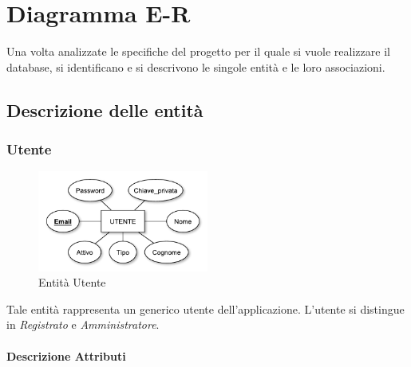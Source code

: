 
\chapter{Diagramma E-R}
\label{cap:diagramma}

Una volta analizzate le specifiche del progetto per il quale si vuole realizzare il database, si identificano e si descrivono le singole entità e le loro associazioni.

\section{Descrizione delle entità}
	
	\subsection{Utente}
	
		\begin{figure}[h]
			\centering
			\includegraphics[width=0.5\textwidth]
			{immagini/01-utente}
			
			\caption{Entità Utente}
		\end{figure}
		
		Tale entità rappresenta un generico utente dell'applicazione. L'utente si distingue in \emph{Registrato} e \emph{Amministratore}.
		
		\subsubsection*{Descrizione Attributi}
		
